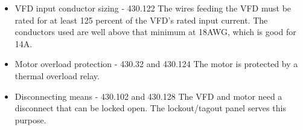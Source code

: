 \begin{itemize}
	\item VFD input conductor sizing - 430.122 {\newline} {\indent}
	      The wires feeding the VFD must be rated for at least 125 percent of the VFD’s rated input current. The conductors used are well above that minimum at 18AWG, which
	      is good for 14A.

	\item Motor overload protection - 430.32 and 430.124  {\newline} {\indent}
	      The motor is protected by a thermal overload relay.

	\item Disconnecting means - 430.102 and 430.128 {\newline} {\indent}
	      The VFD and motor need a disconnect that can be locked open. The lockout/tagout panel serves this purpose.
\end{itemize}
